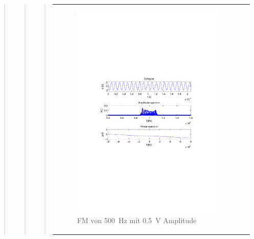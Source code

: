 \begin{quote}
\begin{quote}
\begin{quote}
            
            
            \begin{center}
            \begin{tabular}{ll}
            
            \hspace{-5cm}
                \begin{minipage}{0.6\textwidth}
                    \begin{figure}[H]
                        \label{fig:f100_05}
                        \includegraphics[scale=0.7, trim = 35mm 100mm 35mm 95mm, clip]{Bilder/f50_05}
                        \caption{FM von \SI{500}{\hertz} mit \SI{0,5}{\volt} Amplitude}
                    \end{figure}
                \end{minipage}
                

\end{tabular}
\end{center}
\end{quote}
\end{quote}
\end{quote}
